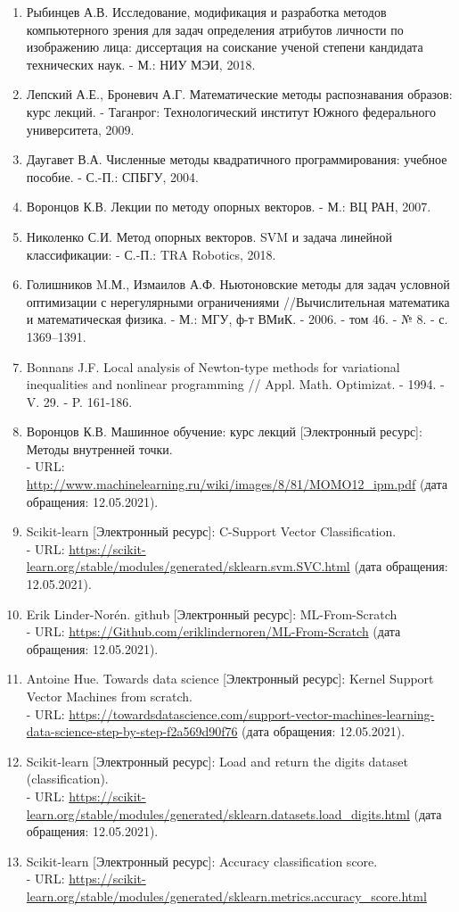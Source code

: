 \documentclass[12pt,a4paper]{article}
\begin{document}
\begin{enumerate}
    \item Рыбинцев А.В. Исследование, модификация и разработка методов компьютерного зрения для задач определения атрибутов личности по изображению лица: диссертация на соискание ученой степени кандидата технических наук. - М.: НИУ МЭИ, 2018.
    \item Лепский А.Е., Броневич А.Г. Математические методы распознавания образов: курс лекций. - Таганрог: Технологический институт Южного федерального университета, 2009.
    \item Даугавет В.А. Численные методы квадратичного программирования: учебное пособие. - С.-П.: СПБГУ, 2004.
    \item Воронцов К.В. Лекции по методу опорных векторов. - М.: ВЦ РАН, 2007.
    \item Николенко С.И. Метод опорных векторов. SVM и задача линейной классификации: - С.-П.: TRA Robotics, 2018.
    \item Голишников M.М., Измаилов А.Ф. Ньютоновские методы для задач условной оптимизации с нерегулярными ограничениями //Вычислительная математика и математическая физика. - М.: МГУ, ф-т ВМиК. - 2006. - том 46. - № 8. - с. 1369–1391.
    \item Bonnans J.F. Local analysis of Newton-type methods for variational inequalities and nonlinear programming // Appl. Math. Optimizat. - 1994. - V. 29. - P. 161-186.
    \item Воронцов К.В. Машинное обучение: курс лекций [Электронный ресурс]: Методы внутренней точки. \\ - URL: \url{http://www.machinelearning.ru/wiki/images/8/81/MOMO12_ipm.pdf} (дата обращения: 12.05.2021).
    \item Scikit-learn [Электронный ресурс]: C-Support Vector Classification. \\ - URL: \url{https://scikit-learn.org/stable/modules/generated/sklearn.svm.SVC.html} (дата обращения: 12.05.2021).
    \item Erik Linder-Norén. github [Электронный ресурс]: ML-From-Scratch \\ - URL: \url{https://Github.com/eriklindernoren/ML-From-Scratch} (дата обращения: 12.05.2021).
    \item Antoine Hue. Towards data science [Электронный ресурс]: Kernel Support Vector Machines from scratch. \\ - URL: \url{https://towardsdatascience.com/support-vector-machines-learning-data-science-step-by-step-f2a569d90f76} (дата обращения: 12.05.2021).
    \item Scikit-learn [Электронный ресурс]: Load and return the digits dataset (classification). \\ - URL: \url{https://scikit-learn.org/stable/modules/generated/sklearn.datasets.load_digits.html} (дата обращения: 12.05.2021).
    \item Scikit-learn [Электронный ресурс]: Accuracy classification score. \\ - URL: \url{https://scikit-learn.org/stable/modules/generated/sklearn.metrics.accuracy_score.html} 
\end{enumerate}
\end{document}
